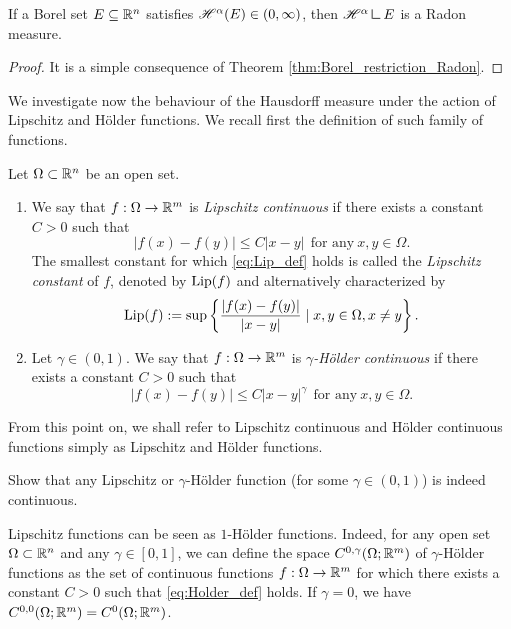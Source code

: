 \begin{proposition}
If a Borel set $E \subseteq \mathbb{R}^n$ satisfies $\mathscr{H}^{\alpha}(E) \in
(0,\infty)$, then $\Haus{\alpha} \mres E$ is a Radon measure.
\end{proposition}
\begin{proof}
It is a simple consequence of Theorem \ref{thm:Borel_restriction_Radon}. 
\end{proof}

We investigate now the behaviour of the Hausdorff measure under the action of Lipschitz and H\"older functions. We recall first the definition of such family of functions.

\begin{definition} Let $\Omega \subset \mathbb{R}^{n}$ be an open set.
\begin{enumerate}[(1)]
\item We say that $f : \Omega \to \mathbb{R}^{m}$ is {\em Lipschitz continuous} if there exists a constant $C > 0$ such that
\begin{equation} \label{eq:Lip_def}
|f(x) - f(y)| \le C |x - y| \ \ \text{for any} \ x, y \in \Omega.
\end{equation}
The smallest constant for which \eqref{eq:Lip_def} holds is called the {\em Lipschitz constant} of $f$, denoted by $\operatorname{Lip}(f)$ and alternatively characterized by
\begin{equation}
\operatorname{Lip}(f) := \sup \left \{ \frac{|f(x) - f(y)|}{|x - y|} \mid x, y \in \Omega, x \neq y \right \}.
\end{equation}
\item Let $\gamma \in (0,1)$. We say that $f: \Omega \to \mathbb{R}^{m}$ is {\em $\gamma$-H\"older continuous} if there exists a constant $C > 0$ such that
\begin{equation} \label{eq:Holder_def}
|f(x) - f(y)| \le C |x - y|^{\gamma} \ \ \text{for any} \ x, y \in \Omega.
\end{equation}
\end{enumerate}
\end{definition}

From this point on, we shall refer to Lipschitz continuous and H\"older continuous functions simply as Lipschitz and H\"older functions. 

\begin{exercise}
Show that any Lipschitz or $\gamma$-H\"older function (for some $\gamma \in (0,1)$) is indeed continuous.
\end{exercise}

\begin{remark} \label{rem:Lip_Holder}
Lipschitz functions can be seen as $1$-H\"older functions. Indeed, for any open set $\Omega \subset \mathbb{R}^{n}$ and any $\gamma \in [0, 1]$, we can define the space $C^{0, \gamma}(\Omega; \mathbb{R}^{m})$ of $\gamma$-H\"older functions as the set of continuous functions $f : \Omega \to \mathbb{R}^{m}$ for which there exists a constant $C > 0$ such that \eqref{eq:Holder_def} holds. If $\gamma = 0$, we have $C^{0, 0}(\Omega; \mathbb{R}^{m}) = C^{0}(\Omega; \mathbb{R}^{m})$. 
\end{remark}

